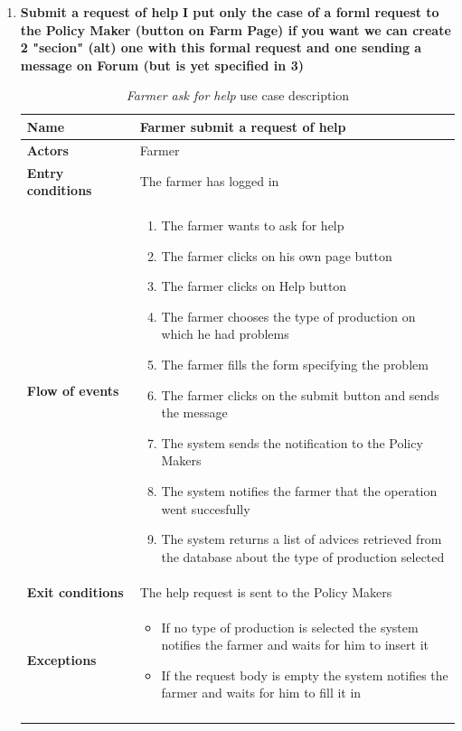 \begin{enumerate}
    \item \textbf{Submit a request of help}
    \textbf{I put only the case of a forml request to the Policy Maker (button on Farm Page) if you want we can create 2 "secion" (alt) one with this formal request and one sending a message on Forum (but is yet specified in 3)}
    \begin{longtable}{p{0.26\linewidth}p{0.75\linewidth}}
        \toprule
        \textbf{Name} & \textbf{Farmer submit a request of help} \\
        \midrule
        \textbf{Actors} & Farmer \\
        \midrule
        \textbf{Entry conditions} & The farmer has logged in\\
        \midrule
        \textbf{Flow of events} & 
        \begin{enumerate}
            \item The farmer wants to ask for help
            \item The farmer clicks on his own page button
            \item The farmer clicks on Help button
            \item The farmer chooses the type of production on which he had problems
            \item The farmer fills the form specifying the problem
            \item The farmer clicks on the submit button and sends the message
            \item The system sends the notification to the Policy Makers
            \item The system notifies the farmer that the operation went succesfully
            \item The system returns a list of advices retrieved from the database about the type of production selected
        \end{enumerate} \\
        \midrule
        \textbf{Exit conditions} & The help request is sent to the Policy Makers\\
        \midrule
        \textbf{Exceptions} & 
        \begin{itemize}
            \item If no type of production is selected the system notifies the farmer and waits for him to insert it
            \item If the request body is empty the system notifies the farmer and waits for him to fill it in
        \end{itemize}\\
        \bottomrule
        \caption{\emph{Farmer ask for help} use case description}
    \end{longtable}


\end{enumerate}

